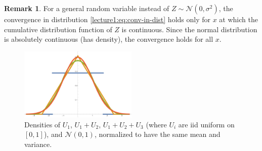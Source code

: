 \documentclass[letterpaper,11pt,oneside,reqno]{book}
\numberwithin{equation}{chapter}  %
\theoremstyle{definition}
\newtheorem{remark}[proposition]{Remark}
\begin{document}
\begin{remark}
	For a general random variable instead of
	$Z\sim \mathcal{N}(0, \sigma^2)$, the convergence in distribution
	\eqref{lecture1:eq:conv-in-dist} holds only for $x$ at which the cumulative distribution function of $Z$ is continuous.
	Since the normal distribution is absolutely continuous (has density), the convergence holds for all $x$.
\end{remark}
\begin{figure}[htpb]
	\centering
	\includegraphics[width=0.5\textwidth]{./pictures/uniform_pdfs.pdf}
	\caption{Densities of $U_1$, $U_1+U_2$, $U_1+U_2+U_3$ (where $U_i$ are iid uniform on $[0,1]$),
		and $\mathcal{N}(0,1)$,
		normalized to have the same mean and variance.}
	\label{lecture1:fig:uniform_pdfs}
\end{figure}
\end{document}
